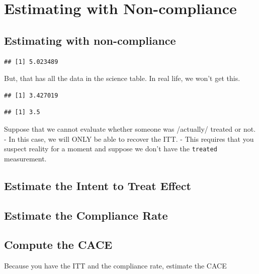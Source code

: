 \documentclass[
]{book}
\begin{document}
\hypertarget{estimating-with-non-compliance}{%
\section{Estimating with
Non-compliance}\label{estimating-with-non-compliance}}

\hypertarget{estimating-with-non-compliance-1}{%
\subsection{Estimating with
non-compliance}\label{estimating-with-non-compliance-1}}

\begin{verbatim}
## [1] 5.023489
\end{verbatim}

But, that has all the data in the science table. In real life, we won't
get this.

\begin{verbatim}
## [1] 3.427019
\end{verbatim}

\begin{verbatim}
## [1] 3.5
\end{verbatim}

Suppose that we cannot evaluate whether someone was /actually/ treated
or not. - In this case, we will ONLY be able to recover the ITT. - This
requires that you suspect reality for a moment and suppose we don't have
the \texttt{treated} measurement.

\hypertarget{estimate-the-intent-to-treat-effect}{%
\subsection{Estimate the Intent to Treat
Effect}\label{estimate-the-intent-to-treat-effect}}

\hypertarget{estimate-the-compliance-rate}{%
\subsection{Estimate the Compliance
Rate}\label{estimate-the-compliance-rate}}

\hypertarget{compute-the-cace}{%
\subsection{Compute the CACE}\label{compute-the-cace}}

Because you have the ITT and the compliance rate, estimate the CACE
\end{document}
